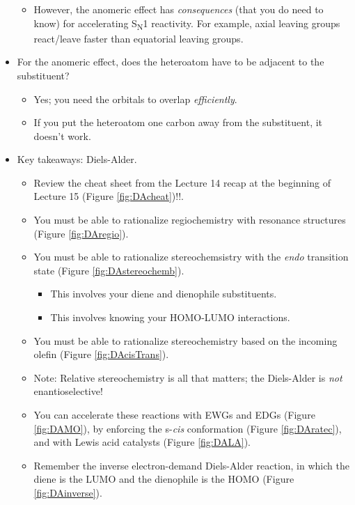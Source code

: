 \documentclass[../notes.tex]{subfiles}
\begin{document}
\begin{itemize}
\begin{itemize}
        \item However, the anomeric effect has \emph{consequences} (that you do need to know) for accelerating S\textsubscript{N}1 reactivity. For example, axial leaving groups react/leave faster than equatorial leaving groups.
    \end{itemize}
    \item For the anomeric effect, does the heteroatom have to be adjacent to the substituent?
    \begin{itemize}
        \item Yes; you need the orbitals to overlap \emph{efficiently}.
        \item If you put the heteroatom one carbon away from the substituent, it doesn't work.
    \end{itemize}
    \item Key takeaways: Diels-Alder.
    \begin{itemize}
        \item Review the cheat sheet from the Lecture 14 recap at the beginning of Lecture 15 (Figure \ref{fig:DAcheat})!!.
        \item You must be able to rationalize regiochemistry with resonance structures (Figure \ref{fig:DAregio}).
        \item You must be able to rationalize stereochemsistry with the \emph{endo} transition state (Figure \ref{fig:DAstereochemb}).
        \begin{itemize}
            \item This involves your diene and dienophile substituents.
            \item This involves knowing your HOMO-LUMO interactions.
        \end{itemize}
        \pagebreak
        \item You must be able to rationalize stereochemistry based on the incoming olefin (Figure \ref{fig:DAcisTrans}).
        \item Note: Relative stereochemistry is all that matters; the Diels-Alder is \emph{not} enantioselective!
        \item You can accelerate these reactions with EWGs and EDGs (Figure \ref{fig:DAMO}), by enforcing the s-\emph{cis} conformation (Figure \ref{fig:DAratec}), and with Lewis acid catalysts (Figure \ref{fig:DALA}).
        \item Remember the inverse electron-demand Diels-Alder reaction, in which the diene is the LUMO and the dienophile is the HOMO (Figure \ref{fig:DAinverse}).

\end{itemize}
\end{itemize}
\end{document}
